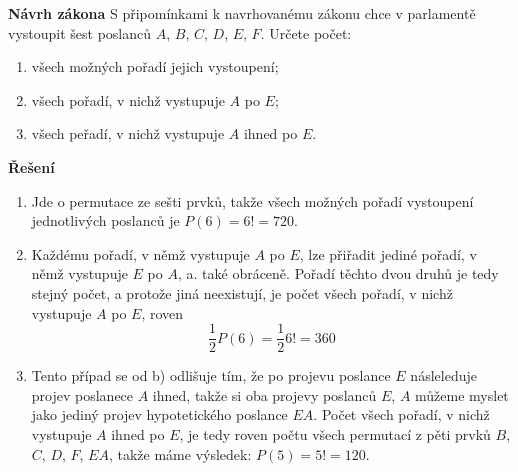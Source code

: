 \begin{mdframed}[style=mdexam]
  \begin{example}\label{mai:exam057}
    \textbf{Návrh zákona}\newline
    S připomínkami k navrhovanému zákonu chce v parlamentě vystoupit šest poslanců \(A\), \(B\),
    \(C\), \(D\), \(E\), \(F\). Určete počet: 
    \begin{enumerate}[leftmargin=2em,rightmargin=1em, label=\emph{\alph*}),noitemsep]
      \item všech možných pořadí jejich vystoupení;
      \item všech pořadí, v nichž vystupuje \(A\) po \(E\);
      \item všech peřadí, v nichž vystupuje \(A\) ihned po \(E\).
    \end{enumerate} \vspace{0.5em}
    \textbf{Řešení} \vspace{0.5em}

    \begin{enumerate}[leftmargin=2em, label=\emph{\alph*}),noitemsep]
      \item Jde o permutace ze sešti prvků, takže všech možných pořadí vystoupení jednotlivých
            poslanců je \(P(6) = 6! = 720\).
      \item Každému pořadí, v němž vystupuje \(A\) po \(E\), lze přiřadit jediné pořadí, v němž
            vystupuje \(E\) po \(A\), a. také obráceně. Pořadí těchto dvou druhů je tedy stejný
            počet, a protože jiná neexistují, je počet všech pořadí, v nichž vystupuje \(A\) po
            \(E\), roven
            \begin{equation*}
              \dfrac{1}{2}P(6) = \dfrac{1}{2}6! = 360
            \end{equation*}      
      \item Tento případ se od b) odlišuje tím, že po projevu poslance \(E\) násleleduje projev
            poslanece \(A\) ihned, takže si oba projevy poslanců \(E\), \(A\) můžeme myslet jako
            jediný projev hypotetického poslance \(EA\). Počet všech pořadí, v nichž vystupuje \(A\)
            ihned po \(E\), je tedy roven počtu všech permutací z pěti prvků \(B\), \(C\), \(D\),
            \(F\), \(EA\), takže máme výsledek: \(P(5) = 5! = 120\).
    \end{enumerate}
  \end{example}
\end{mdframed}